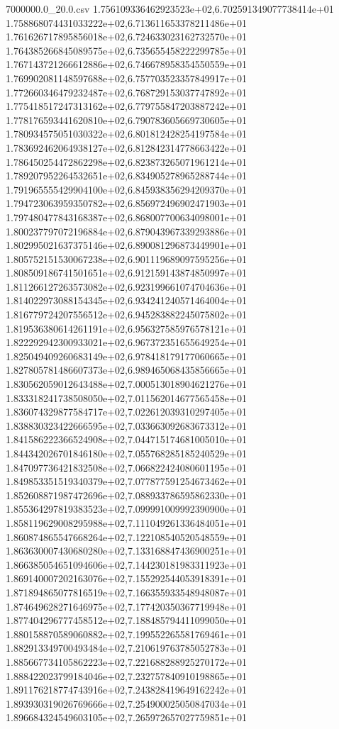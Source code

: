 \begin{filecontents*}{7000000.0_20.0.csv}
1.756109336462923523e+02,6.702591349077738414e+01
1.758868074431033222e+02,6.713611653378211486e+01
1.761626717895856018e+02,6.724633023162732570e+01
1.764385266845089575e+02,6.735655458222299785e+01
1.767143721266612886e+02,6.746678958354550559e+01
1.769902081148597688e+02,6.757703523357849917e+01
1.772660346479232487e+02,6.768729153037747892e+01
1.775418517247313162e+02,6.779755847203887242e+01
1.778176593441620810e+02,6.790783605669730605e+01
1.780934575051030322e+02,6.801812428254197584e+01
1.783692462064938127e+02,6.812842314778663422e+01
1.786450254472862298e+02,6.823873265071961214e+01
1.789207952264532651e+02,6.834905278965288744e+01
1.791965555429904100e+02,6.845938356294209370e+01
1.794723063959350782e+02,6.856972496902471903e+01
1.797480477843168387e+02,6.868007700634098001e+01
1.800237797072196884e+02,6.879043967339293886e+01
1.802995021637375146e+02,6.890081296873449901e+01
1.805752151530067238e+02,6.901119689097595256e+01
1.808509186741501651e+02,6.912159143874850997e+01
1.811266127263573082e+02,6.923199661074704636e+01
1.814022973088154345e+02,6.934241240571464004e+01
1.816779724207556512e+02,6.945283882245075802e+01
1.819536380614261191e+02,6.956327585976578121e+01
1.822292942300933021e+02,6.967372351655649254e+01
1.825049409260683149e+02,6.978418179177060665e+01
1.827805781486607373e+02,6.989465068435856665e+01
1.830562059012643488e+02,7.000513018904621276e+01
1.833318241738508050e+02,7.011562014677565458e+01
1.836074329877584717e+02,7.022612039310297405e+01
1.838830323422666595e+02,7.033663092683673312e+01
1.841586222366524908e+02,7.044715174681005010e+01
1.844342026701846180e+02,7.055768285185240529e+01
1.847097736421832508e+02,7.066822424080601195e+01
1.849853351519340379e+02,7.077877591254673462e+01
1.852608871987472696e+02,7.088933786595862330e+01
1.855364297819383523e+02,7.099991009992390900e+01
1.858119629008295988e+02,7.111049261336484051e+01
1.860874865547668264e+02,7.122108540520548559e+01
1.863630007430680280e+02,7.133168847436900251e+01
1.866385054651094606e+02,7.144230181983311923e+01
1.869140007202163076e+02,7.155292544053918391e+01
1.871894865077816519e+02,7.166355933548948087e+01
1.874649628271646975e+02,7.177420350367719948e+01
1.877404296777458512e+02,7.188485794411099050e+01
1.880158870589060882e+02,7.199552265581769461e+01
1.882913349700493484e+02,7.210619763785052783e+01
1.885667734105862223e+02,7.221688288925270172e+01
1.888422023799184046e+02,7.232757840910198865e+01
1.891176218774743916e+02,7.243828419649162242e+01
1.893930319026769666e+02,7.254900025050847034e+01
1.896684324549603105e+02,7.265972657027759851e+01

\end{filecontents*}
